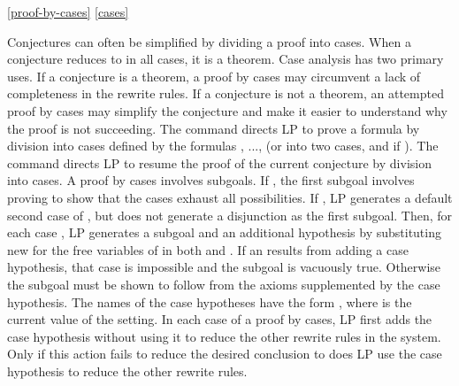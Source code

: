 \ref{proof-by-cases}
\ref{cases}

Conjectures can often be simplified by dividing a proof into cases.  When a
conjecture reduces to  in all cases, it is a theorem.  Case analysis
has two primary uses.  If a conjecture is a theorem, a proof by cases may
circumvent a lack of completeness in the rewrite rules.  If a conjecture is not
a theorem, an attempted proof by cases may simplify the conjecture and make it
easier to understand why the proof is not succeeding.
\p
The command  directs LP to prove a formula 
 by division into  cases defined by the formulas , ..., 
 (or into two cases,  and  if ).  The command 
 directs LP to resume the proof of the current 
conjecture by division into cases.
\p
A proof by cases involves  subgoals.  If , the first subgoal
involves proving  to show that the cases exhaust all
possibilities.  If , LP generates a default second case of ,
but does not generate a disjunction as the first subgoal.  Then, for each case
, LP generates a subgoal  and an additional hypothesis  by
substituting new  for the free variables of 
in both  and .  If an  results
from adding a case hypothesis, that case is impossible and the subgoal is
vacuously true.  Otherwise the subgoal must be shown to follow from the axioms
supplemented by the case hypothesis.  The names of the case hypotheses have the
form , where  is the current
value of the  setting.
\p
In each case of a proof by cases, LP first adds the case hypothesis without
using it to reduce the other rewrite rules in the system.  Only if this action
fails to reduce the desired conclusion to  does LP use the case
hypothesis to reduce the other rewrite rules.

